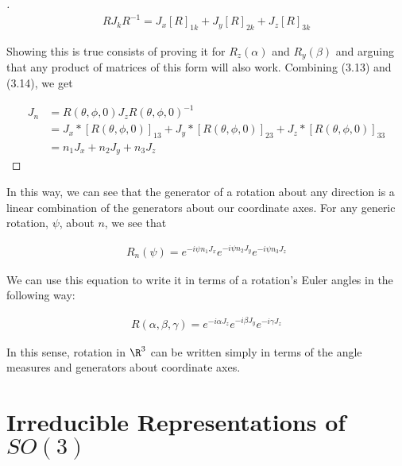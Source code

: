 \begin{proof}[\cite{Tung}]
\begin{equation}
	\begin{aligned}
		RJ_kR^{-1} = J_x [R]_{1k} + J_y  [R]_{2k}  +J_z  [R]_{3k} 
	\end{aligned}
\end{equation}

Showing this is true consists of proving it for $R_z(\alpha)$ and $R_y(\beta)$ and arguing that any product of matrices of this form will also work. Combining (3.13) and (3.14), we get 

\begin{equation}
	\begin{aligned}
		J_n &= R(\theta,\phi,0)J_z R(\theta,\phi,0)^{-1} \\
			&= J_x * [R(\theta,\phi,0)]_{13} + J_y * [R(\theta,\phi,0)]_{23}  +J_z * [R(\theta,\phi,0)]_{33}\\
			 &= n_1J_x + n_2J_y + n_3J_z 
	\end{aligned}
\end{equation} 
\end{proof}

In this way, we can see that the generator of a rotation about any direction is a linear combination of the generators about our coordinate axes. For any generic rotation, $\psi$, about $n$, we see that 

\begin{equation}
	\begin{aligned}
		R_n(\psi) = e^{-i\psi n_1J_x}e^{-i\psi n_2J_y}e^{-i\psi n_3J_z}
	\end{aligned}
\end{equation} 

We can use this equation to write it in terms of a rotation's Euler angles in the following way:

\begin{equation}
	\begin{aligned}
		R(\alpha,\beta,\gamma) = e^{-i\alpha J_z}e^{-i\beta J_y}e^{-i\gamma J_z}
	\end{aligned}
\end{equation} 

In this sense, rotation in $\R^3$ can be written simply in terms of the angle measures and generators about coordinate axes.

\section{Irreducible Representations of $SO(3)$}


